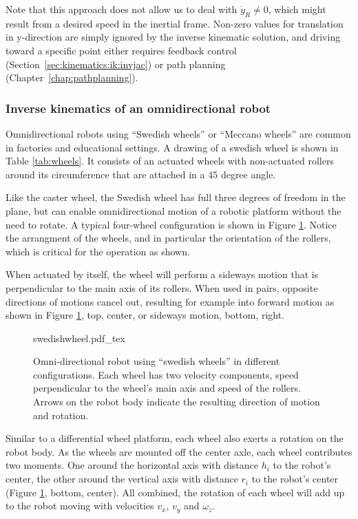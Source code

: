Note that this approach does not allow us to deal with $\dot{y}_R \neq 0$, which might result from a desired speed in the inertial frame. Non-zero values for translation in y-direction are simply ignored by the inverse kinematic solution, and driving toward a specific point either requires feedback control (Section~\ref{sec:kinematics:ik:invjac}) or path planning (Chapter~\ref{chap:pathplanning}).

\subsubsection{Inverse kinematics of an omnidirectional robot}
Omnidirectional robots using ``Swedish wheels''  or ``Meccano wheels''  are common in factories and educational settings. A drawing of a swedish wheel is shown in Table \ref{tab:wheels}. It consists of an actuated wheels with non-actuated rollers around its circumference that are attached in a 45 degree angle.

Like the caster wheel, the Swedish wheel has full three degrees of freedom in the plane, but can enable omnidirectional motion of a robotic platform without the need to rotate. A typical four-wheel configuration is shown in Figure \ref{fig:swedishwheel}. Notice the arrangment of the wheels, and in particular the orientation of the rollers, which is critical for the operation as shown.

When actuated by itself, the wheel will perform a sideways motion that is perpendicular to the main axis of its rollers. When used in pairs, opposite directions of motions cancel out, resulting for example into forward motion as shown in Figure \ref{fig:swedishwheel}, top, center, or sideways motion, bottom, right.


 \begin{figure}[htb!]
    \centering
    \def\svgwidth{0.9\textwidth}
    {swedishwheel.pdf_tex}
    \caption{Omni-directional robot using ``swedish wheels'' in different configurations. Each wheel has two velocity components, speed perpendicular to the wheel's main axis and speed of the rollers. Arrows on the robot body indicate the resulting direction of motion and rotation. }
    \label{fig:swedishwheel}
\end{figure}

Similar to a differential wheel platform, each wheel also exerts a rotation on the robot body. As the wheels are mounted off the center axle, each wheel contributes two moments. One around the horizontal axis with distance $h_i$ to the robot's center, the other around the vertical axis with distance $r_i$ to the robot's center (Figure \ref{fig:swedishwheel}, bottom, center). All combined, the rotation of each wheel will add up to the robot moving with velocities $v_x$, $v_y$ and $\omega_z$.

